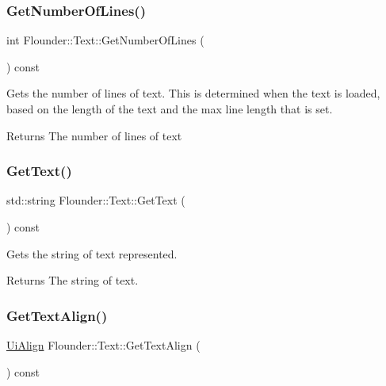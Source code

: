 \subsubsection{\texorpdfstring{Get\+Number\+Of\+Lines()}{GetNumberOfLines()}}
{\footnotesize\ttfamily int Flounder\+::\+Text\+::\+Get\+Number\+Of\+Lines (\begin{DoxyParamCaption}{ }\end{DoxyParamCaption}) const\hspace{0.3cm}{\ttfamily [inline]}}



Gets the number of lines of text. This is determined when the text is loaded, based on the length of the text and the max line length that is set. 

\begin{DoxyReturn}{Returns}
The number of lines of text 
\end{DoxyReturn}
\mbox{\label{class_flounder_1_1_text_ac674d336e2a4f44959492f9a5c01acf1}} 
\subsubsection{\texorpdfstring{Get\+Text()}{GetText()}}
{\footnotesize\ttfamily std\+::string Flounder\+::\+Text\+::\+Get\+Text (\begin{DoxyParamCaption}{ }\end{DoxyParamCaption}) const\hspace{0.3cm}{\ttfamily [inline]}}



Gets the string of text represented. 

\begin{DoxyReturn}{Returns}
The string of text. 
\end{DoxyReturn}
\mbox{\label{class_flounder_1_1_text_a91dba4cff619b092bb9c05f76cf7885b}} 
\subsubsection{\texorpdfstring{Get\+Text\+Align()}{GetTextAlign()}}
{\footnotesize\ttfamily \hyperlink{namespace_flounder_a561db2012ae4152be62bcd882407d361}{Ui\+Align} Flounder\+::\+Text\+::\+Get\+Text\+Align (\begin{DoxyParamCaption}{ }\end{DoxyParamCaption}) const\hspace{0.3cm}{\ttfamily [inline]}}



